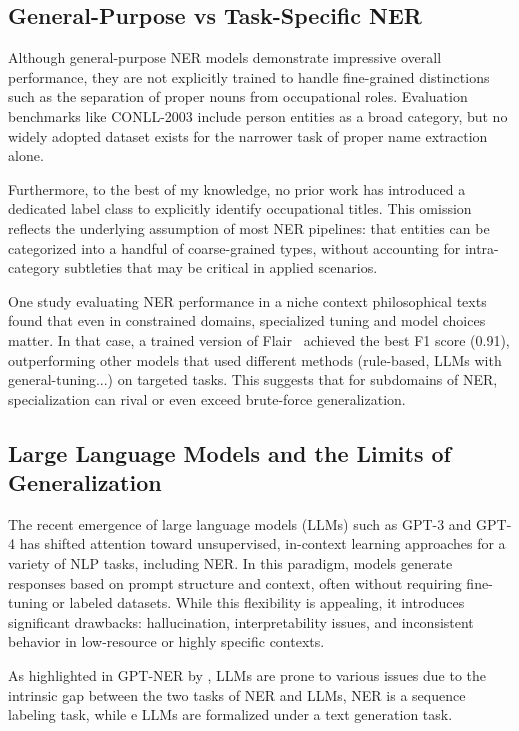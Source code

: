 \documentclass[a4paper]{usiinfbachelorproject}
\begin{document}
\subsection{General-Purpose vs Task-Specific NER}

Although general-purpose NER models demonstrate impressive overall performance, they are not explicitly trained to handle fine-grained distinctions such as the separation of proper nouns from occupational roles. Evaluation benchmarks like CONLL-2003 include person entities as a broad category, but no widely adopted dataset exists for the narrower task of proper name extraction alone.

Furthermore, to the best of my knowledge, no prior work has introduced a dedicated label class to explicitly identify occupational titles. This omission reflects the underlying assumption of most NER pipelines: that entities can be categorized into a handful of coarse-grained types, without accounting for intra-category subtleties that may be critical in applied scenarios.

One study evaluating NER performance in a niche context philosophical texts\cite{weijers2025evaluation} found that even in constrained domains, specialized tuning and model choices matter. In that case, a trained version of Flair~\cite{akbik-etal-2019-flair} achieved the best F1 score (0.91), outperforming other models that used different methods (rule-based, LLMs with general-tuning...) on targeted tasks. This suggests that for subdomains of NER, specialization can rival or even exceed brute-force generalization.

\subsection{Large Language Models and the Limits of Generalization}

The recent emergence of large language models (LLMs) such as GPT-3 and GPT-4 has shifted attention toward unsupervised, in-context learning approaches for a variety of NLP tasks, including NER. In this paradigm, models generate responses based on prompt structure and context, often without requiring fine-tuning or labeled datasets. While this flexibility is appealing, it introduces significant drawbacks: hallucination, interpretability issues, and inconsistent behavior in low-resource or highly specific contexts.

As highlighted in GPT-NER by \cite{DBLP:journals/corr/abs-2304-10428}, LLMs are prone to various issues due to the intrinsic gap between the two tasks of NER and LLMs, NER is a sequence labeling task, while e LLMs are formalized under a text generation task.
\end{document}
